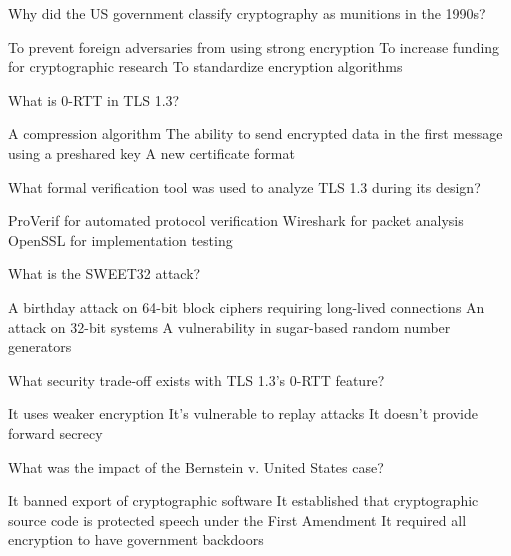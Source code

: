 \documentclass[10pt,a4paper,american]{exam}
\begin{document}
\begin{questions}
	\question Why did the US government classify cryptography as munitions in the 1990s?
	\begin{randomizechoices}
		\CorrectChoice To prevent foreign adversaries from using strong encryption
		\choice To increase funding for cryptographic research
		\choice To standardize encryption algorithms
	\end{randomizechoices}

	\question What is 0-RTT in TLS 1.3?
	\begin{randomizechoices}
		\choice A compression algorithm
		\CorrectChoice The ability to send encrypted data in the first message using a preshared key
		\choice A new certificate format
	\end{randomizechoices}

	\question What formal verification tool was used to analyze TLS 1.3 during its design?
	\begin{randomizechoices}
		\CorrectChoice ProVerif for automated protocol verification
		\choice Wireshark for packet analysis
		\choice OpenSSL for implementation testing
	\end{randomizechoices}

	\question What is the SWEET32 attack?
	\begin{randomizechoices}
		\CorrectChoice A birthday attack on 64-bit block ciphers requiring long-lived connections
		\choice An attack on 32-bit systems
		\choice A vulnerability in sugar-based random number generators
	\end{randomizechoices}

	\question What security trade-off exists with TLS 1.3's 0-RTT feature?
	\begin{randomizechoices}
		\choice It uses weaker encryption
		\CorrectChoice It's vulnerable to replay attacks
		\choice It doesn't provide forward secrecy
	\end{randomizechoices}

	\question What was the impact of the Bernstein v. United States case?
	\begin{randomizechoices}
		\choice It banned export of cryptographic software
		\CorrectChoice It established that cryptographic source code is protected speech under the First Amendment
		\choice It required all encryption to have government backdoors
	\end{randomizechoices}

\end{questions}

\clearpage

\end{document}

